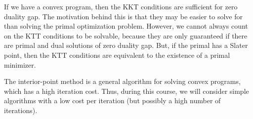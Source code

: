 If we have a convex program, then the KKT conditions are sufficient for zero duality gap. The
motivation behind this is that they may be easier to solve for than solving the primal optimization
problem. However, we cannot always count on the KTT conditions to be solvable, because they are
only guaranteed if there are primal and dual solutions of zero duality gap. But, if the primal has
a Slater point, then the KTT conditions are equivalent to the existence of a primal minimizer.

The interior-point method is a general algorithm for solving convex programs, which has a high
iteration cost. Thus, during this course, we will consider simple algorithms with a low cost per
iteration (but possibly a high number of iterations).
